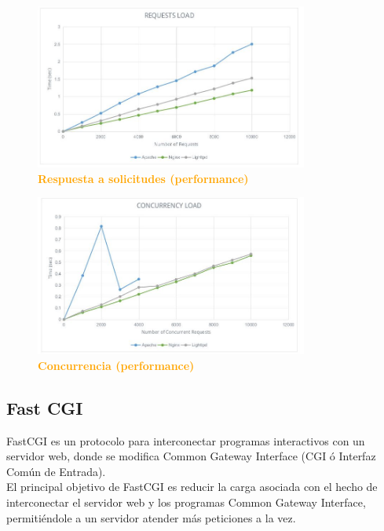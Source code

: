 \documentclass{article}
\begin{document}
\begin{figure}[H]
    \centering
      \includegraphics[width=0.8\textwidth]{figures/r2.jpg}
       \centering
       \caption{\textbf{\textcolor{Orange}{Respuesta a solicitudes (performance)}}}       
    \end{figure}

\begin{figure}[H]
    \centering
      \includegraphics[width=0.8\textwidth]{figures/r3.jpg}
       \centering
       \caption{\textbf{\textcolor{Orange}{Concurrencia (performance)}}}       
    \end{figure}


\subsection{Fast CGI}
FastCGI es un protocolo para interconectar programas interactivos con un servidor web, donde se modifica Common Gateway Interface (CGI ó Interfaz Común de Entrada).\\

El principal objetivo de FastCGI es reducir la carga asociada con el hecho de interconectar el servidor web y los programas Common Gateway Interface, permitiéndole a un servidor atender más peticiones a la vez.\\
\end{document}
